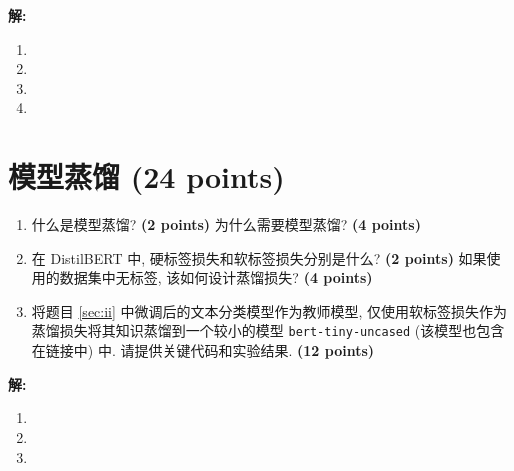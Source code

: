 \documentclass[8pt]{article}
\newcommand{\points}[1]{\textbf{(#1 points)}}
\begin{document}
\textbf{\large 解:}
\begin{enumerate}
    \item %
    \item %
    \item %
    \item %
\end{enumerate}

\section{模型蒸馏 (24 points)}

{\color{gray}\begin{enumerate}
    \item 什么是模型蒸馏? \points{2} 为什么需要模型蒸馏? \points{4}
    \item 在 DistilBERT 中, 硬标签损失和软标签损失分别是什么? \points{2} 如果使用的数据集中无标签, 该如何设计蒸馏损失? \points{4}
    \item 将题目 \ref{sec:ii} 中微调后的文本分类模型作为教师模型, 仅使用软标签损失作为蒸馏损失将其知识蒸馏到一个较小的模型 \texttt{bert-tiny-uncased} (该模型也包含在链接中) 中. 请提供关键代码和实验结果. \points{12}
\end{enumerate}}

\textbf{\large 解:}
\begin{enumerate}
    \item %
    \item %
    \item %
\end{enumerate}
\end{document}
